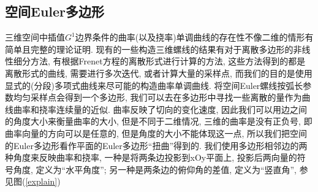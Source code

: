 \documentclass[utf8]{ctexart} %
\begin{document}
	 \subsection{空间Euler多边形}
	 三维空间中插值$G^1$边界条件的曲率(以及挠率)单调曲线的存在性不像二维的情形有简单且完整的理论证明. 现有的一些构造三维螺线的结果有对于离散多边形的非线性细分方法, 有根据Frenet方程的离散形式进行计算的方法, 这些方法得到的都是离散形式的曲线, 需要进行多次迭代, 或者计算大量的采样点, 而我们的目的是使用显式的(分段)多项式曲线来尽可能的构造曲率单调曲线. 将空间Euler螺线按弧长参数均匀采样点会得到一个多边形, 我们可以去在多边形中寻找一些离散的量作为曲线曲率和挠率连续量的近似. 曲率反映了切向的变化速度, 因此我们可以用边之间的角度大小来衡量曲率的大小, 但是不同于二维情况, 三维的曲率是没有正负号, 即曲率向量的方向可以是任意的, 但是角度的大小不能体现这一点, 所以我们把空间的Euler多边形看作平面的Euler多边形“扭曲”得到的. 我们使用多边形相邻边的两种角度来反映曲率和挠率, 一种是将两条边投影到xOy平面上, 投影后两向量的符号角度, 定义为“水平角度”; 另一种是两条边的俯仰角的差值, 定义为“竖直角”, 参见图(\ref{explain})\par 
\end{document}
